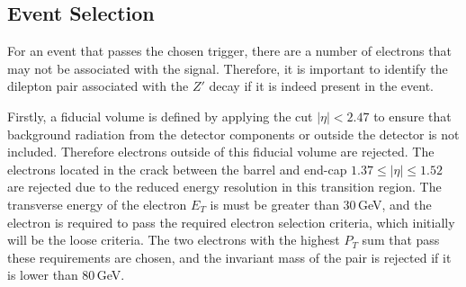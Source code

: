 \documentclass{article}
\begin{document}

\subsection{Event Selection}
\label{sec:cuts_eventSelection}

For an event that passes the chosen trigger, there are a number of electrons that may not be associated with the signal. Therefore, it is important to identify the dilepton pair associated with the $Z'$ decay if it is indeed present in the event. 

Firstly, a fiducial volume is defined by applying the cut $|\eta|<2.47$ to ensure that background radiation from the detector components or outside the detector is not included. Therefore electrons outside of this fiducial volume are rejected. 
The electrons located in the crack between the barrel and end-cap $1.37\leq|\eta|\leq1.52$ are rejected due to the reduced energy resolution in this transition region. 
The transverse energy of the electron $E_T$ is must be greater than $30\,$GeV, and the electron is required to pass the required electron selection criteria, which initially will be the loose criteria.
The two electrons with the highest $P_T$ sum that pass these requirements are chosen, and the invariant mass of the pair is rejected if it is lower than $80\,$GeV.
\end{document}
